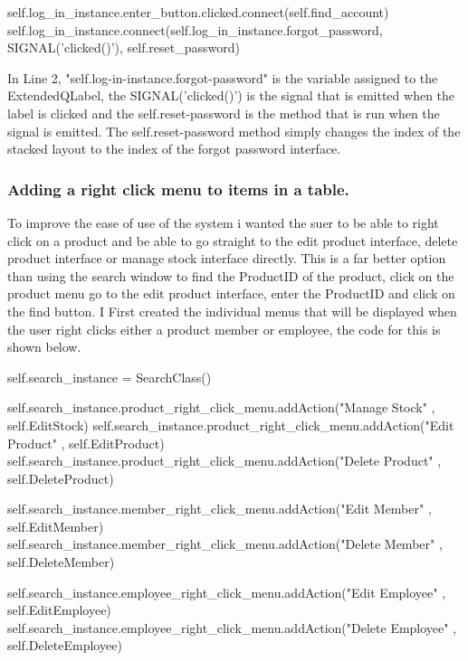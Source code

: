 \begin{python}
self.log_in_instance.enter_button.clicked.connect(self.find_account)
self.log_in_instance.connect(self.log_in_instance.forgot_password, SIGNAL('clicked()'), self.reset_password)
\end{python}

In Line 2, "self.log-in-instance.forgot-password" is the variable assigned to the ExtendedQLabel, the SIGNAL('clicked()') is the signal that is emitted when the label is clicked and the self.reset-password is the method that is run when the signal is emitted. The self.reset-password method simply changes the index of the stacked layout to the index of the forgot password interface.

\subsubsection{Adding a right click menu to items in a table.}

To improve the ease of use of the system i wanted the suer to be able to right click on a product and be able to go straight to the edit product interface, delete product interface or manage stock interface directly. This is a far better option than using the search window to find the ProductID of the product, click on the product menu go to the edit product interface, enter the ProductID and click on the find button. I First created the individual menus that will be displayed when the user right clicks either a product member or employee, the code for this is shown below.

\begin{python}

self.search_instance = SearchClass()
        
self.search_instance.product_right_click_menu.addAction("Manage Stock" , self.EditStock)
self.search_instance.product_right_click_menu.addAction("Edit Product" , self.EditProduct)
self.search_instance.product_right_click_menu.addAction("Delete Product" , self.DeleteProduct)

self.search_instance.member_right_click_menu.addAction("Edit Member" , self.EditMember)
self.search_instance.member_right_click_menu.addAction("Delete Member" , self.DeleteMember)

self.search_instance.employee_right_click_menu.addAction("Edit Employee" , self.EditEmployee)
self.search_instance.employee_right_click_menu.addAction("Delete Employee" , self.DeleteEmployee)

\end{python}

